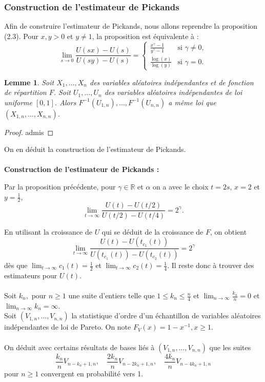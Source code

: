 \documentclass{article}
\theoremstyle{plain}
\theoremstyle{definition}
\theoremstyle{plain}
\newtheorem{lemma}[definition]{Lemme}
\begin{document}
\subsubsection{Construction de l'estimateur de Pickands}

Afin de construire l'estimateur de Pickands, nous allons reprendre la proposition (2.3). Pour \(x,y > 0\) et \(y \neq 1\), la proposition est équivalente à :
\[
\lim_{s \to 0} \frac{U(sx) - U(s)}{U(sy) - U(s)} = 
\begin{cases} 
\frac{x^\gamma - 1}{y^\gamma - 1} & \text{si } \gamma \neq 0, \\
\frac{\log(x)}{\log(y)} & \text{si } \gamma = 0.
\end{cases}
\]
\newline

\begin{lemma}
Soit \(X_1, \dots, X_n\) des variables aléatoires indépendantes et de fonction de répartition \(F\).
Soit \(U_1, \dots, U_n\) des variables aléatoires indépendantes de loi uniforme \(\left[0,1\right]\). Alors \(F^{-1}(U_{1,n}), \dots, F^{-1}(U_{n,n})\) a même loi que \((X_{1,n}, \dots, X_{n,n})\).
\end{lemma}

\begin{proof}
admis
\end{proof}
\noindent On en déduit la construction de l'estimateur de Pickands.
\\
\\
\noindent \textbf{Construction de l'estimateur de Pickands :}

Par la proposition précédente, pour $\gamma \in \mathbb{R}$ et $\alpha$ on a avec le choix $t = 2s$, $x = 2$ et $y = \frac{1}{2}$,
\[
\lim_{t \to \infty} \frac{U(t) - U(t/2)}{U(t/2) - U(t/4)} = 2^{\gamma}.
\]

\noindent En utilisant la croissance de $U$ qui se déduit de la croissance de $F$, on obtient
\[
\lim_{t \to \infty} \frac{U(t) - U(t_{c_1}(t))}{U(t_{c_1}(t)) - U(t_{c_2}(t))} = 2^{\gamma}
\]
dès que $\lim_{t \to \infty} c_1(t) = \frac{1}{2}$ et $\lim_{t \to \infty} c_2(t) = \frac{1}{4}$. Il reste donc à trouver des estimateurs pour $U(t)$.
\\
\\
Soit $k_n,$ pour $ n \geq 1$ une suite d’entiers telle que $1 \leq k_n \leq \frac{n}{4}$ et $\lim_{n \to \infty} \frac{k_n}{n} = 0$ et $\lim_{n \to \infty} k_n = \infty$.
\\
Soit $(V_{1,n},\dots,V_{n,n})$ la statistique d’ordre d’un échantillon de variables aléatoires indépendantes de loi de Pareto. On note $F_V(x) = 1 - x^{-1}, x \geq 1$.
\\
\\
On déduit avec certains résultats de bases liés à $(V_{1,n},\dots,V_{n,n})$ que les suites
\[
\frac{k_n}{n} V_{n-k_n+1,n}, \quad \frac{2k_n}{n} V_{n-2k_n+1,n}, \quad \frac{4k_n}{n} V_{n-4k_n+1,n}
\]
pour \(n \geq 1\) convergent en probabilité vers 1.
\end{document}
